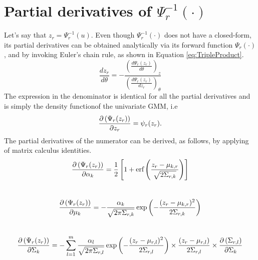 \documentclass{article}
\theoremstyle{plain}
\theoremstyle{definition}
\theoremstyle{remark}
\begin{document}
\section{Partial derivatives of $\Psi^{-1}_r(\cdot)$}\label{apd:gmm_quantile_derivatives}
Let's say that $z_r=\Psi_r^{-1}(u)$. Even though $\Psi^{-1}_r(\cdot)$ does not have a closed-form, its partial derivatives can be obtained analytically via its forward function $\Psi_r(\cdot)$, and by invoking Euler's chain rule, as shown in Equation \eqref{eq:TripleProduct}.
\begin{equation}\label{eq:TripleProduct}
\frac{dz_r}{d\theta}=- \frac{\left(\frac{d\Psi_r(z_r)}{d\theta}\right)_z}{\left(\frac{d\Psi_r(z_r)}{dz_r}\right)_\theta}
\end{equation}
The expression in the denominator is identical for all the partial derivatives and is simply the density functionof the univariate GMM, i.e 
\begin{equation}\label{eq:Gamma_dz}
\der{z_r}{\Psi_r(z_r)}=\psi_r(z_r).
\end{equation}
The partial derivatives of the numerator can be derived, as follows, by applying of matrix calculus identities.
\\
\begin{equation}
\der{\alpha_k}{\Psi_r(z_r)}=\frac{1}{2}\left[1+ \erf \left( \frac{z_r-\mu_{k,r}}{\sqrt{2\Sigma_{r,k}}}\right) \right]
\end{equation}
\\
\begin{equation}
\der{\mu_k}{\Psi_r(z_r)}= -\frac{\alpha_k}{\sqrt{2\pi\Sigma_{r,k}}}\exp\left( - \frac{(z_r-\mu_{k,r})^2}{2\Sigma_{r,k}}	 \right)
\end{equation}
\\
\begin{equation}
\der{\Sigma_k}{\Psi_r(z_r)}= -\sum\limits_{l=1}^{m}\frac{\alpha_l}{\sqrt{2\pi\Sigma_{r,l}}}\exp\left( - \frac{(z_r-\mu_{r,l})^2}{2\Sigma_{r,l}} \right) \times \frac{(z_r-\mu_{r,l})}{2\Sigma_{r,l}} \times \der{\Sigma_k}{\Sigma_{r,l}}
\end{equation}
\end{document}
